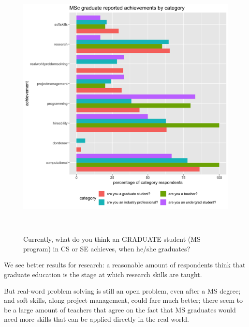 \documentclass{sigchi}
\begin{document}
\begin{figure}
 \includegraphics[scale=0.2]{../data-analysis/plots_output/MSc_graduate_reported_achievements_by_category.png}
  \caption{Currently, what do you think an GRADUATE student (MS program) in CS or SE achieves, when he/she graduates?}~\label{fig:figure3}
\end{figure}

We see better results for research: a reasonable amount of respondents think that graduate education is the  stage at which research skills are taught.

But real-word problem solving is still an open problem, even after a MS degree; and soft skills, along project management, could fare much better; there seem to be a large amount of teachers that agree on the fact that MS graduates would need more skills that can be applied directly in the real world.
\end{document}
